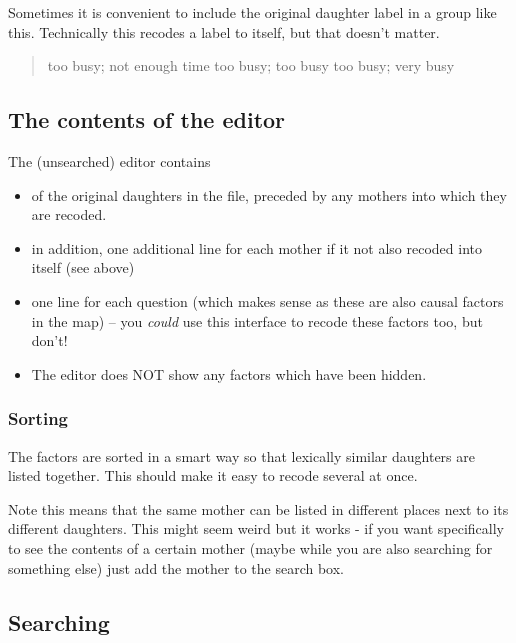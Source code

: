 \documentclass[
]{book}
\providecommand{\tightlist}{%
  \setlength{\itemsep}{0pt}\setlength{\parskip}{0pt}}
\begin{document}
Sometimes it is convenient to include the original daughter label in a group like this. Technically this recodes a label to itself, but that doesn't matter.

\begin{quote}
too busy; not enough time
too busy; too busy
too busy; very busy
\end{quote}

\hypertarget{the-contents-of-the-editor}{%
\subsection{The contents of the editor}\label{the-contents-of-the-editor}}

The (unsearched) editor contains

\begin{itemize}
\tightlist
\item
  of the original daughters in the file, preceded by any mothers into which they are recoded.
\item
  in addition, one additional line for each mother if it not also recoded into itself (see above)
\item
  one line for each question (which makes sense as these are also causal factors in the map) -- you \emph{could} use this interface to recode these factors too, but don't!
\item
  The editor does NOT show any factors which have been hidden.
\end{itemize}

\hypertarget{sorting-2}{%
\subsubsection{Sorting}\label{sorting-2}}

The factors are sorted in a smart way so that lexically similar daughters are listed together. This should make it easy to recode several at once.

Note this means that the same mother can be listed in different places next to its different daughters. This might seem weird but it works - if you want specifically to see the contents of a certain mother (maybe while you are also searching for something else) just add the mother to the search box.

\hypertarget{searching}{%
\subsection{Searching}\label{searching}}
\end{document}
